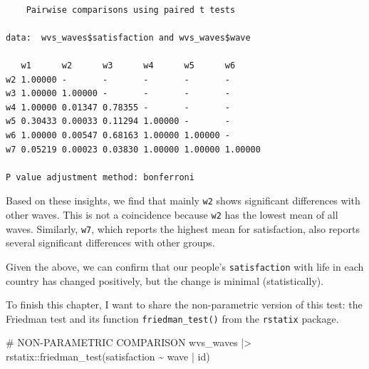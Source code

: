 \documentclass[
  letterpaper,
  DIV=11,
  numbers=noendperiod]{scrreprt}
\newenvironment{Shaded}{\begin{snugshade}}{\end{snugshade}}
\newcommand{\AttributeTok}[1]{\textcolor[rgb]{0.40,0.45,0.13}{#1}}
\newcommand{\CommentTok}[1]{\textcolor[rgb]{0.37,0.37,0.37}{#1}}
\newcommand{\ConstantTok}[1]{\textcolor[rgb]{0.56,0.35,0.01}{#1}}
\newcommand{\FunctionTok}[1]{\textcolor[rgb]{0.28,0.35,0.67}{#1}}
\newcommand{\NormalTok}[1]{\textcolor[rgb]{0.00,0.23,0.31}{#1}}
\newcommand{\SpecialCharTok}[1]{\textcolor[rgb]{0.37,0.37,0.37}{#1}}
\newcommand{\StringTok}[1]{\textcolor[rgb]{0.13,0.47,0.30}{#1}}
\begin{document}
\begin{Shaded}
\end{Shaded}

\begin{verbatim}

    Pairwise comparisons using paired t tests 

data:  wvs_waves$satisfaction and wvs_waves$wave 

   w1      w2      w3      w4      w5      w6     
w2 1.00000 -       -       -       -       -      
w3 1.00000 1.00000 -       -       -       -      
w4 1.00000 0.01347 0.78355 -       -       -      
w5 0.30433 0.00033 0.11294 1.00000 -       -      
w6 1.00000 0.00547 0.68163 1.00000 1.00000 -      
w7 0.05219 0.00023 0.03830 1.00000 1.00000 1.00000

P value adjustment method: bonferroni 
\end{verbatim}

Based on these insights, we find that mainly \texttt{w2} shows
significant differences with other waves. This is not a coincidence
because \texttt{w2} has the lowest mean of all waves. Similarly,
\texttt{w7}, which reports the highest mean for satisfaction, also
reports several significant differences with other groups.

Given the above, we can confirm that our people's \texttt{satisfaction}
with life in each country has changed positively, but the change is
minimal (statistically).

To finish this chapter, I want to share the non-parametric version of
this test: the Friedman test and its function \texttt{friedman\_test()}
from the \texttt{rstatix} package.

\begin{Shaded}
\begin{Highlighting}[]
\CommentTok{\# NON{-}PARAMETRIC COMPARISON}
\NormalTok{wvs\_waves }\SpecialCharTok{|\textgreater{}}\NormalTok{ rstatix}\SpecialCharTok{::}\FunctionTok{friedman\_test}\NormalTok{(satisfaction }\SpecialCharTok{\textasciitilde{}}\NormalTok{ wave }\SpecialCharTok{|}\NormalTok{ id)}
\end{Highlighting}
\end{Shaded}
\end{document}
